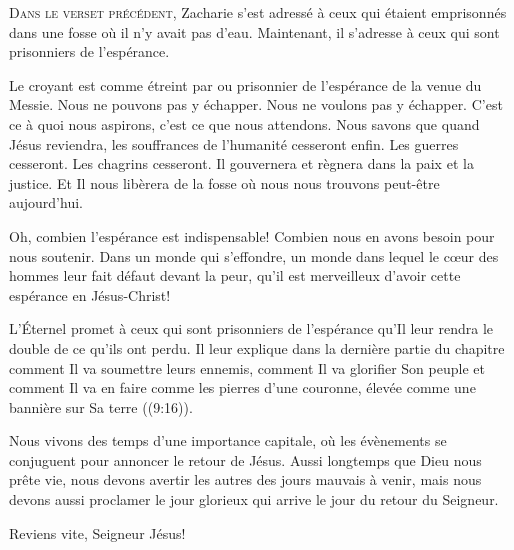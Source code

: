 



\lettrine{D}{ans le verset précédent,} Zacharie s'est adressé à ceux
 qui étaient emprisonnés dans une fosse où il n'y avait pas d'eau.
 Maintenant, il s'adresse à ceux qui sont prisonniers de l'espérance. 

Le croyant est comme \og étreint par \fg{} ou \og prisonnier de \fg{}
 l'espérance de la venue du Messie. Nous ne pouvons pas y échapper.
 Nous ne voulons pas y échapper. C'est ce à quoi nous aspirons,
 c'est ce que nous attendons. Nous savons que quand Jésus reviendra,
 les souffrances de l'humanité cesseront enfin. Les guerres cesseront.
 Les chagrins cesseront. Il gouvernera et règnera dans la paix et la justice.
 Et Il nous libèrera de la fosse où nous nous trouvons peut-être aujourd'hui. 


Oh, combien l'espérance est indispensable! Combien nous en avons besoin
 pour nous soutenir. Dans un monde qui s'effondre, un monde dans lequel
 le cœur des hommes leur fait défaut devant la peur,
 qu'il est merveilleux d'avoir cette espérance en Jésus-Christ! 

L'Éternel promet à ceux qui sont prisonniers de l'espérance qu'Il leur rendra
 le double de ce qu'ils ont perdu. Il leur explique dans la dernière partie
 du chapitre comment Il va soumettre leurs ennemis, comment Il va glorifier
 Son peuple et comment Il va en faire comme les pierres d'une couronne,
 \og élevée comme une bannière sur Sa terre \fg{} ((9:16)). 

Nous vivons des temps d'une importance capitale, où les évènements
 se conjuguent pour annoncer le retour de Jésus. Aussi longtemps que Dieu
 nous prête vie, nous devons avertir les autres des jours mauvais à venir,
 mais nous devons aussi proclamer le jour glorieux qui arrive
 \ocadr le jour du retour du Seigneur. 

Reviens vite, Seigneur Jésus! 

\dvrule

